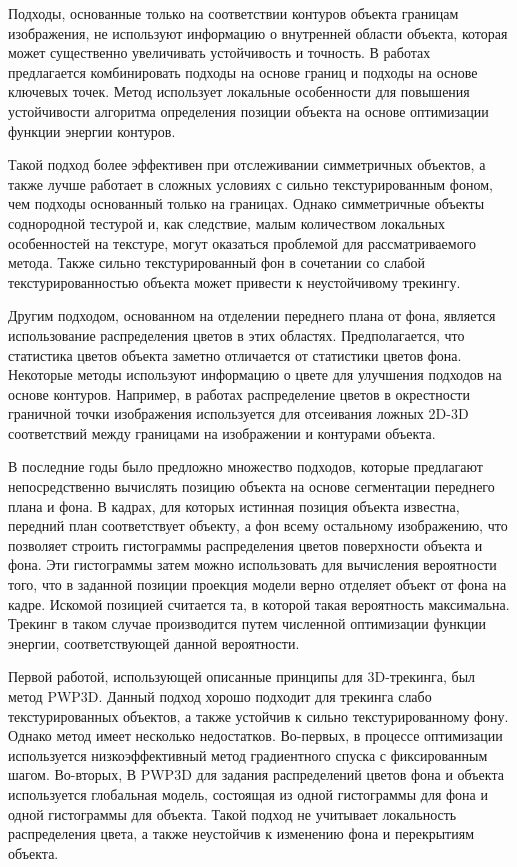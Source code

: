 Подходы, основанные только на соответствии контуров объекта границам
изображения, не используют информацию о внутренней области объекта, которая
может существенно увеличивать устойчивость и точность.
В работах \cite{VacchettiEdges2004,ChoiFeaturesAndEdges,Bugaev_2018_ECCV}
предлагается комбинировать подходы на основе границ и подходы на основе
ключевых точек.
Метод \cite{Bugaev_2018_ECCV} использует локальные особенности для повышения
устойчивости алгоритма определения позиции объекта на основе оптимизации
функции энергии контуров.

Такой подход более эффективен при отслеживании симметричных объектов, а также
лучше работает в сложных условиях с сильно текстурированным фоном, чем подходы
основанный только на границах.
Однако симметричные объекты соднородной тестурой и, как следствие, малым
количеством локальных особенностей на текстуре, могут оказаться проблемой для
рассматриваемого метода.
Также сильно текстурированный фон в сочетании со слабой текстурированностью
объекта может привести к неустойчивому трекингу.

Другим подходом, основанном на отделении переднего плана от фона, является
использование распределения цветов в этих областях.
Предполагается, что статистика цветов объекта заметно отличается от статистики
цветов фона.
Некоторые методы \cite{SeoHinterstoisser2014,WangZhong2015,Zhong2018}
используют информацию о цвете для улучшения подходов на основе контуров.
Например, в работах \cite{SeoHinterstoisser2014,WangZhong2015} распределение
цветов в окрестности граничной точки изображения используется для отсеивания
ложных 2D-3D соответствий между границами на изображении и контурами объекта.

В последние годы было предложно множество подходов, которые предлагают
непосредственно вычислять позицию объекта на основе сегментации переднего
плана и фона.
В кадрах, для которых истинная позиция объекта известна, передний план
соответствует объекту, а фон всему остальному изображению, что позволяет
строить гистограммы распределения цветов поверхности объекта и фона.
Эти гистограммы затем можно использовать для вычисления вероятности того, что в
заданной позиции проекция модели верно отделяет объект от фона на кадре.
Искомой позицией считается та, в которой такая вероятность максимальна.
Трекинг в таком случае производится путем численной оптимизации функции
энергии, соответствующей данной вероятности.

Первой работой, использующей описанные принципы для 3D-трекинга, был метод
PWP3D\cite{PWP3D}.
Данный подход хорошо подходит для трекинга слабо текстурированных объектов, а
также устойчив к сильно текстурированному фону.
Однако метод \cite{PWP3D} имеет несколько недостатков.
Во-первых, в процессе оптимизации используется низкоэффективный метод
градиентного спуска с фиксированным шагом.
Во-вторых, В PWP3D для задания распределений цветов фона и объекта используется
глобальная модель, состоящая из одной гистограммы для фона и одной гистограммы
для объекта.
Такой подход не учитывает локальность распределения цвета, а также неустойчив к
изменению фона и перекрытиям объекта.

